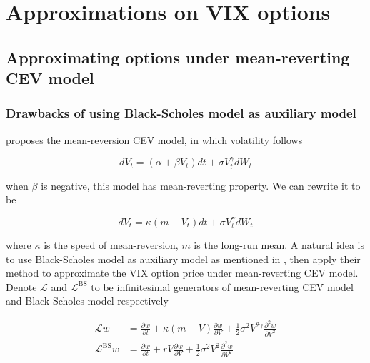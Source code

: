 \chapter{Approximations on VIX options}


\section{Approximating options under mean-reverting CEV model}
\label{sec: 3.1}

\subsection{Drawbacks of using Black-Scholes model as auxiliary model}
\cite{chan_empirical_1992} proposes the mean-reversion CEV model, in which volatility follows

$$
    d V_{t}=\left(\alpha+\beta V_{t}\right) d t+\sigma V_{t}^{\gamma} d W_{t}
$$

\noindent when $\beta$ is negative, this model has mean-reverting property. We can rewrite it to be

\begin{equation}\label{mr}
    d V_t=\kappa(m - V_t) d t+\sigma V^{\gamma}_t d W_t
\end{equation}

\noindent where $\kappa$ is the speed of mean-reversion, $m$ is the long-run mean. A natural idea is to use Black-Scholes model as auxiliary model as mentioned in \cite{kristensen_adding_2011}, then apply their method to approximate the VIX option price under mean-reverting CEV model. Denote $\mathcal{L}$ and $\mathcal{L}^{\text{BS}}$ to be infinitesimal generators of mean-reverting CEV model and Black-Scholes model respectively

$$
\begin{aligned}
    \mathcal{L} w&= \frac{\partial w}{\partial t}+\kappa(m - V) \frac{\partial w}{\partial V}+\frac{1}{2} \sigma^{2} V^{2\gamma} \frac{\partial^{2} w}{\partial V^{2}} \\
    \mathcal{L}^{\text{BS}} w &= \frac{\partial w}{\partial t}+rV \frac{\partial w}{\partial V}+\frac{1}{2} \sigma^{2} V^2 \frac{\partial^{2} w}{\partial V^{2}}
\end{aligned}
$$

